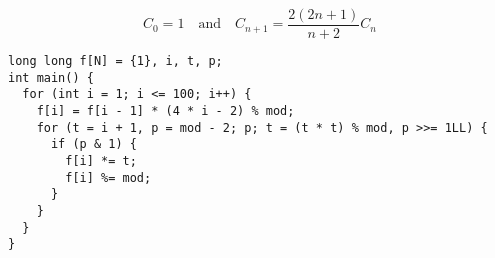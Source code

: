 \[C_0 = 1 \quad \mbox{and} \quad C_{n+1}=\frac{2(2n+1)}{n+2}C_n\]

\begin{lstlisting}
long long f[N] = {1}, i, t, p;
int main() {
  for (int i = 1; i <= 100; i++) {
    f[i] = f[i - 1] * (4 * i - 2) % mod;
    for (t = i + 1, p = mod - 2; p; t = (t * t) % mod, p >>= 1LL) {
      if (p & 1) {
        f[i] *= t;
        f[i] %= mod;
      }
    }
  }
}
\end{lstlisting}